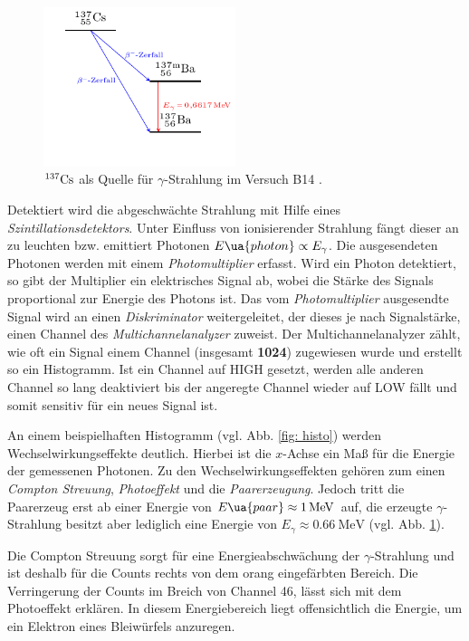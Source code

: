 \begin{figure}[h]
  \centering
  \includegraphics[width=0.5\textwidth]{pics/tikz-Energieschema.pdf}
  \caption{$^{137}\ce{Cs}$ als Quelle für $\gamma$-Strahlung im Versuch B14 \cite{luckyjosh}.}
  \label{fig: zerfall}
\end{figure}

Detektiert wird die abgeschwächte Strahlung mit Hilfe eines \emph{Szintillationsdetektors}.
Unter Einfluss von ionisierender Strahlung fängt dieser an zu leuchten bzw. emittiert Photonen $E\ua{photon}\propto E_\gamma$.
Die ausgesendeten Photonen werden mit einem \emph{Photomultiplier} erfasst. Wird ein Photon detektiert,
so gibt der Multiplier ein elektrisches Signal ab, wobei die Stärke des Signals proportional zur Energie des Photons ist.
Das vom \emph{Photomultiplier} ausgesendte Signal
wird an einen \emph{Diskriminator} weitergeleitet, der dieses je nach Signalstärke, einen Channel des
\emph{Multichannelanalyzer} zuweist. Der Multichannelanalyzer zählt, wie oft ein Signal einem Channel (insgesamt \textbf{1024}) zugewiesen wurde und
erstellt so ein Histogramm. Ist ein Channel auf HIGH gesetzt, werden alle anderen Channel so lang deaktiviert
bis der angeregte Channel wieder auf LOW fällt und somit sensitiv für ein neues Signal ist.

An einem beispielhaften Histogramm (vgl. Abb. \ref{fig: histo}) werden Wechselwirkungseffekte deutlich.
Hierbei ist die $x$-Achse ein Maß für die Energie der gemessenen Photonen.
Zu den Wechselwirkungseffekten gehören zum einen \emph{Compton Streuung}, \emph{Photoeffekt} und die \emph{Paarerzeugung}.
Jedoch tritt die Paarerzeug erst ab einer Energie von $E\ua{paar}\approx \SI{1}{\mega\eV}$ auf, die erzeugte $\gamma$-Strahlung
besitzt aber lediglich eine Energie von $E_{\gamma}\approx\SI{0.66}{\mega\eV}$ (vgl. Abb. \ref{fig: zerfall}).

Die Compton Streuung sorgt für eine Energieabschwächung der $\gamma$-Strahlung und ist deshalb für die Counts rechts von dem
orang eingefärbten Bereich. Die Verringerung der Counts im Breich von Channel 46, lässt sich mit dem Photoeffekt erklären.
In diesem Energiebereich liegt offensichtlich die Energie, um ein Elektron eines Bleiwürfels anzuregen.  %

